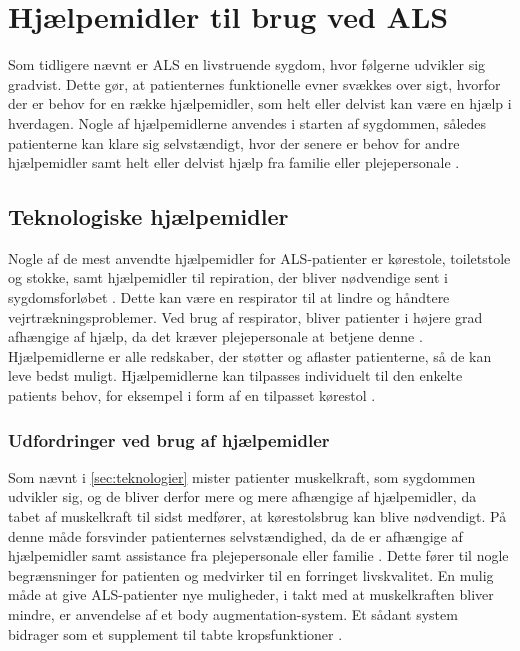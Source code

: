 \section{Hjælpemidler til brug ved ALS} \label{sec:teknologier}
Som tidligere nævnt er ALS en livstruende sygdom, hvor følgerne udvikler sig gradvist. Dette gør, at patienternes funktionelle evner svækkes over sigt, hvorfor der er behov for en række hjælpemidler, som helt eller delvist kan være en hjælp i hverdagen. Nogle af hjælpemidlerne anvendes i starten af sygdommen, således patienterne kan klare sig selvstændigt, hvor der senere er behov for andre hjælpemidler samt helt eller delvist hjælp fra familie eller plejepersonale \citep{brandt2010}.

\subsection{Teknologiske hjælpemidler}
Nogle af de mest anvendte hjælpemidler for ALS-patienter er kørestole, toiletstole og stokke, \citep{brandt2010} samt hjælpemidler til repiration, der bliver nødvendige sent i sygdomsforløbet \citep{hefferman2006}. Dette kan være en respirator til at lindre og håndtere vejrtrækningsproblemer. Ved brug af respirator, bliver patienter i højere grad afhængige af hjælp, da det kræver plejepersonale at betjene denne  \citep{rcfm2001}.  Hjælpemidlerne er alle redskaber, der støtter og aflaster patienterne, så de kan leve bedst muligt. Hjælpemidlerne kan tilpasses individuelt til den enkelte patients behov, for eksempel i form af en tilpasset kørestol \citep{brandt2010}.

\subsubsection{Udfordringer ved brug af hjælpemidler}
Som nævnt i \autoref{sec:teknologier} mister patienter muskelkraft, som sygdommen udvikler sig, og de bliver derfor mere og mere afhængige af hjælpemidler, da tabet af muskelkraft til sidst medfører, at kørestolsbrug kan blive nødvendigt. På denne måde forsvinder patienternes selvstændighed, da de er afhængige af hjælpemidler samt assistance fra plejepersonale eller familie \citep{brandt2010}. Dette fører til nogle begrænsninger for patienten og medvirker til en forringet livskvalitet. En mulig måde at give ALS-patienter nye muligheder, i takt med at muskelkraften bliver mindre, er anvendelse af et body augmentation-system. Et sådant system bidrager som et supplement til tabte kropsfunktioner \citep{erlen2003}.


